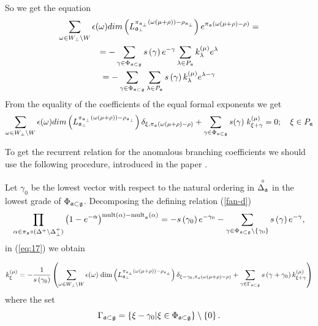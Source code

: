 \documentclass[a4paper,12pt]{article}
\theoremstyle{definition} \newtheorem{Def}{Definition}
\begin{document}
So we get the equation
\begin{multline}
  \label{eq:16}
  \sum_{\omega\in W_{\bot}\backslash W} \epsilon(\omega) dim\left(L^{\pi_{\mathfrak{a}_{\bot}}(\omega(\mu+\rho))-\rho_{\mathfrak{a}_{\bot}}}_{\mathfrak{a}_{\bot}}\right) e^{\pi_{\mathfrak{a}}(\omega(\mu+\rho)-\rho)}=\\
  = -\sum_{\gamma \in \Phi _{\frak{a}\subset \frak{g}}} s\left( \gamma \right) e^{-\gamma }\sum_{\lambda \in P_{\frak{a}}}
  k_{\lambda }^{\left( \mu \right) }e^{\lambda } \\
  =-\sum_{\gamma \in \Phi _{\frak{a}\subset \frak{g}}}\sum_{\lambda \in P_{\frak{a}}}s\left( \gamma \right) k_{\lambda }^{\left( \mu \right)}e^{\lambda -\gamma }
\end{multline}
From the equality of the coefficients of the equal formal exponents we get
\begin{equation}
  \label{eq:17}
   \sum_{\omega\in W_{\bot}\backslash W} \epsilon(\omega) dim\left(L^{\pi_{\mathfrak{a}_{\bot}}(\omega(\mu+\rho))-\rho_{\mathfrak{a}_{\bot}}}_{\mathfrak{a}_{\bot}}\right) \delta_{\xi,\pi_{\mathfrak{a}}(\omega(\mu+\rho)-\rho)}+
   \sum_{\gamma \in \Phi _{\frak{a}\subset \frak{g}}} s(\gamma)\; k^{(\mu)}_{\xi+\gamma}=0;\quad \xi\in P_{\mathfrak{a}}
\end{equation}

To get the recurrent relation for the anomalous branching coefficients we should use the following procedure, introduced in the paper \cite{ilyin812pbc}.

Let $\gamma
_{0} $ be the lowest vector with respect to the natural ordering in $%
\overset{\circ }{\Delta _{\frak{a}}}$ in the lowest grade of $\Phi _{\frak{a}\subset \frak{g}}$. Decomposing the defining relation (\ref{fan-d}) 
\begin{equation}
  \label{eq:18}
  \prod_{\alpha\in \pi_{\mathfrak{a}}\circ (\Delta^{+}\setminus \Delta^{+}_{\bot})}\left(
    1-e^{-\alpha }\right) ^{\mathrm{{mult}\left( \alpha \right) -{mult}}_{\frak{a%
      }}\mathrm{\left( \alpha \right) }}=-s\left( \gamma _{0}\right) e^{-\gamma
    _{0}}-\sum_{\gamma \in \Phi _{\frak{a}\subset \frak{g}}\setminus \left\{\gamma_{0}\right\}}s\left( \gamma \right) e^{-\gamma },  
\end{equation}
in (\ref{eq:17}) we obtain

\begin{equation}
  k_{\xi }^{\left( \mu \right) }=
  -\frac{1}{s\left( \gamma _{0}\right) }
  \left(
    \sum_{\omega\in W_{\bot}\backslash W} \epsilon(\omega)\; \mathrm{dim}
    \left(L^{\pi_{\mathfrak{a}_{\bot}}(\omega(\mu+\rho))-\rho_{\mathfrak{a}_{\bot}}}_{\mathfrak{a}_{\bot}}\right)
    \delta_{\xi-\gamma_0,\pi_{\mathfrak{a}}(\omega(\mu+\rho)-\rho)}+
    \sum_{\gamma \in \Gamma _{\frak{a}\subset \frak{g}}} s\left( \gamma +\gamma _{0}\right) k_{\xi+\gamma }^{\left( \mu \right) }
  \right)   
\label{recurrent relation}
\end{equation}
where the set 
\begin{equation}
\Gamma _{\frak{a}\subset \frak{g}}=\left\{ \xi -\gamma _{0}|\xi \in \Phi _{%
\frak{a}\subset \frak{g}}\right\} \setminus \left\{ 0\right\} .
\label{fan-defined}
\end{equation}
\end{document}
